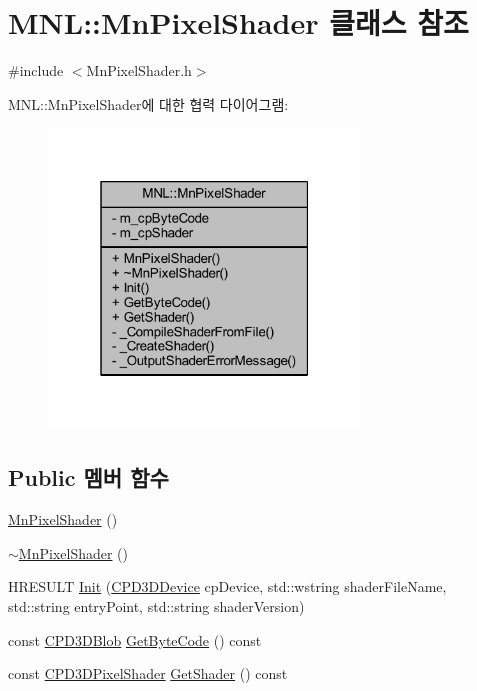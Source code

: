 \hypertarget{class_m_n_l_1_1_mn_pixel_shader}{}\section{M\+NL\+:\+:Mn\+Pixel\+Shader 클래스 참조}
\label{class_m_n_l_1_1_mn_pixel_shader}


{\ttfamily \#include $<$Mn\+Pixel\+Shader.\+h$>$}



M\+NL\+:\+:Mn\+Pixel\+Shader에 대한 협력 다이어그램\+:\nopagebreak
\begin{figure}[H]
\begin{center}
\leavevmode
\includegraphics[width=235pt]{class_m_n_l_1_1_mn_pixel_shader__coll__graph}
\end{center}
\end{figure}
\subsection*{Public 멤버 함수}
\begin{DoxyCompactItemize}
\item 
\hyperlink{class_m_n_l_1_1_mn_pixel_shader_a28326df19b17b959ded2b0be89105fcb}{Mn\+Pixel\+Shader} ()
\item 
\hyperlink{class_m_n_l_1_1_mn_pixel_shader_a1cf973996fa4f7cf4155fee3ee32c3b6}{$\sim$\+Mn\+Pixel\+Shader} ()
\item 
H\+R\+E\+S\+U\+LT \hyperlink{class_m_n_l_1_1_mn_pixel_shader_aebcf62590c1e66bd7b9211d227087674}{Init} (\hyperlink{namespace_m_n_l_a1eec210db8f309a4a9ac0d9658784c31}{C\+P\+D3\+D\+Device} cp\+Device, std\+::wstring shader\+File\+Name, std\+::string entry\+Point, std\+::string shader\+Version)
\item 
const \hyperlink{namespace_m_n_l_a3716e3bee60c31fe1b7b5dd5a82db59a}{C\+P\+D3\+D\+Blob} \hyperlink{class_m_n_l_1_1_mn_pixel_shader_a9d25644c65020454a47baa6bed1f7d3e}{Get\+Byte\+Code} () const
\item 
const \hyperlink{namespace_m_n_l_a4d6bd408e6e19137a03728583296f12a}{C\+P\+D3\+D\+Pixel\+Shader} \hyperlink{class_m_n_l_1_1_mn_pixel_shader_a7bb94a0a541152261d7cdce85c9983bf}{Get\+Shader} () const
\end{DoxyCompactItemize}
